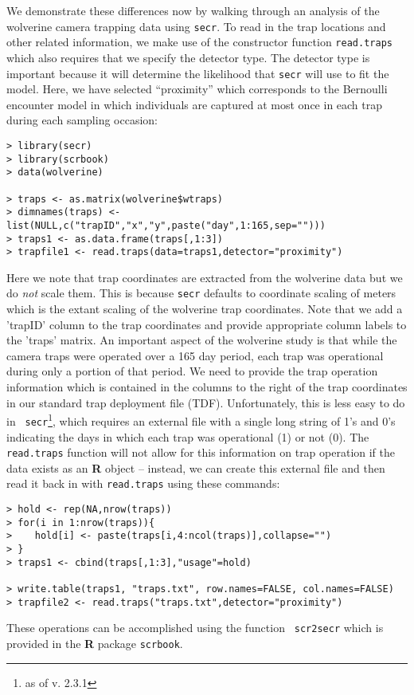 We demonstrate these differences now by walking through an analysis of
the wolverine camera trapping data using \mbox{\tt secr}.  To read in
the trap locations and other related information, we make use of the
constructor function \mbox{\tt read.traps} which also requires that we
specify the detector type.  The detector type is important because it
will determine the likelihood that \mbox{\tt secr} will use to fit the
model.  Here, we have selected ``proximity'' which corresponds to the
Bernoulli encounter model in which individuals are captured at most
once in each trap during each sampling occasion: 
{\small
\begin{verbatim}
> library(secr)
> library(scrbook)
> data(wolverine)

> traps <- as.matrix(wolverine$wtraps)
> dimnames(traps) <- list(NULL,c("trapID","x","y",paste("day",1:165,sep="")))
> traps1 <- as.data.frame(traps[,1:3])
> trapfile1 <- read.traps(data=traps1,detector="proximity")
\end{verbatim}
}
Here we note that trap coordinates are extracted from the wolverine
data but we do {\it not} scale them. This is because
\mbox{\tt secr} defaults to coordinate scaling of meters which is the
extant scaling of the wolverine trap coordinates. Note that we add a 'trapID' column to
the trap coordinates and provide appropriate column labels to the
'traps' matrix. 
An important aspect of the
wolverine study is that while the camera traps were operated over a
165 day period, each trap was operational during only a portion of
that period. We need to provide the trap operation information which
is contained in the columns to the right of the trap coordinates in
our standard trap deployment file (TDF). Unfortunately, this is less easy to do in \mbox{\tt
  secr}\footnote{as of v. 2.3.1}, which 
requires an external file with a single long string of
1's and 0's indicating the days in which each trap was operational (1)
or not (0). The \mbox{\tt read.traps} function will not allow for this
 information on trap operation if the data exists as an {\bf R} object
 -- instead, we can create this external file and then read it back in
with \mbox{\tt read.traps} using these commands:
\begin{verbatim}
> hold <- rep(NA,nrow(traps))
> for(i in 1:nrow(traps)){
>    hold[i] <- paste(traps[i,4:ncol(traps)],collapse="")
> }
> traps1 <- cbind(traps[,1:3],"usage"=hold)

> write.table(traps1, "traps.txt", row.names=FALSE, col.names=FALSE)
> trapfile2 <- read.traps("traps.txt",detector="proximity") 
\end{verbatim}
These operations can be accomplished using the function \mbox{\tt
  scr2secr} which is provided in the {\bf R} package \mbox{\tt scrbook}.

